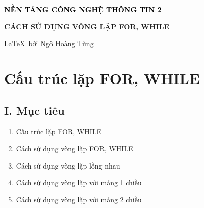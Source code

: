 
\begin{center}
    \textbf{\textcolor{black}{\large\LARGE NỀN TẢNG CÔNG NGHỆ THÔNG TIN 2}}

    \textbf{\large CÁCH SỬ DỤNG VÒNG LẶP FOR, WHILE}

    \large\LaTeX\, bởi Ngô Hoàng Tùng
\end{center}


\section*{Cấu trúc lặp FOR, WHILE}
\subsection*{\textbf{I. Mục tiêu}}
\begin{enumerate}[label=\alph*.]
    \item Cấu trúc lặp FOR, WHILE
    \item Cách sử dụng vòng lặp FOR, WHILE
    \item Cách sử dụng vòng lặp lồng nhau
    \item Cách sử dụng vòng lặp với mảng 1 chiều
    \item Cách sử dụng vòng lặp với mảng 2 chiều
\end{enumerate}
